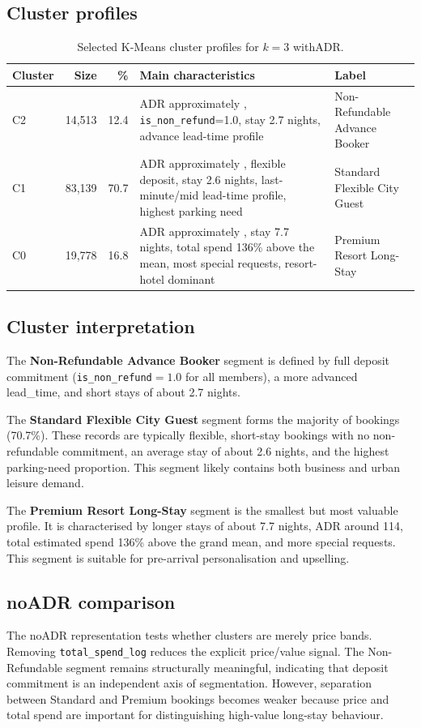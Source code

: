 \documentclass[11pt,a4paper]{article}
\begin{document}
\subsection{Cluster profiles}
\begin{table}[H]
\centering
\caption{Selected K-Means cluster profiles for $k=3$ withADR.}
\begin{tabularx}{\textwidth}{lrrXl}
\toprule
\textbf{Cluster} & \textbf{Size} & \textbf{\%} & \textbf{Main characteristics} & \textbf{Label} \\
\midrule
C2 & 14,513 & 12.4 & ADR approximately \texteuro 90, \texttt{is\_non\_refund}=1.0, stay 2.7 nights, advance lead-time profile & Non-Refundable Advance Booker \\
C1 & 83,139 & 70.7 & ADR approximately \texteuro 103, flexible deposit, stay 2.6 nights, last-minute/mid lead-time profile, highest parking need & Standard Flexible City Guest \\
C0 & 19,778 & 16.8 & ADR approximately \texteuro 114, stay 7.7 nights, total spend 136\% above the mean, most special requests, resort-hotel dominant & Premium Resort Long-Stay \\
\bottomrule
\end{tabularx}
\end{table}

\subsection{Cluster interpretation}
The \textbf{Non-Refundable Advance Booker} segment is defined by full deposit commitment (\texttt{is\_non\_refund}$=1.0$ for all members), a more advanced lead\_time, and short stays of about 2.7 nights. 

The \textbf{Standard Flexible City Guest} segment forms the majority of bookings (70.7\%). These records are typically flexible, short-stay bookings with no non-refundable commitment, an average stay of about 2.6 nights, and the highest parking-need proportion. This segment likely contains both business and urban leisure demand.

The \textbf{Premium Resort Long-Stay} segment is the smallest but most valuable profile. It is characterised by longer stays of about 7.7 nights, ADR around \texteuro{}114, total estimated spend 136\% above the grand mean, and more special requests. This segment is suitable for pre-arrival personalisation and upselling.

\subsection{noADR comparison}
The noADR representation tests whether clusters are merely price bands. Removing \texttt{total\_spend\_log} reduces the explicit price/value signal. The Non-Refundable segment remains structurally meaningful, indicating that deposit commitment is an independent axis of segmentation. However, separation between Standard and Premium bookings becomes weaker because price and total spend are important for distinguishing high-value long-stay behaviour.
\end{document}
